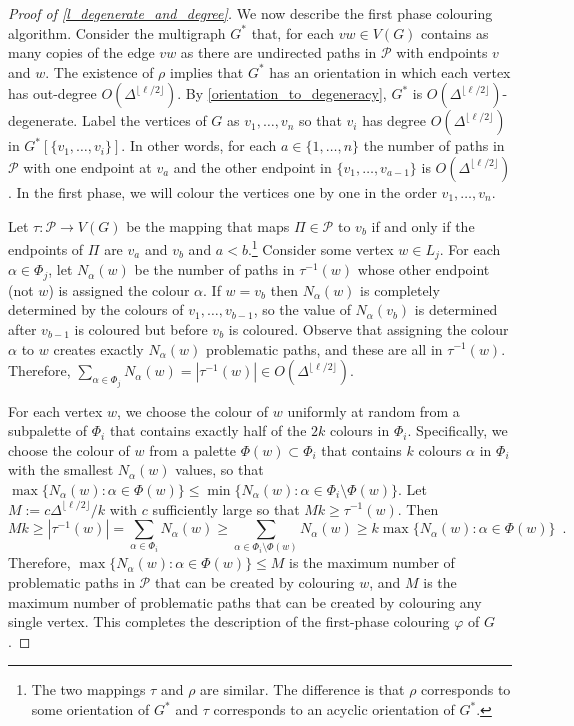 \documentclass{patmorin}
\begin{document}
\begin{proof}[Proof of \cref{l_degenerate_and_degree}]
  We now describe the first phase colouring algorithm.  Consider the multigraph $G^*$ that, for each $vw\in V(G)$ contains as many copies of the edge $vw$ as there are undirected paths in $\mathcal{P}$ with endpoints $v$ and $w$.  The existence of $\rho$ implies that $G^*$ has an orientation in which each vertex has out-degree $O(\Delta^{\lfloor\ell /2\rfloor})$.  By \cref{orientation_to_degeneracy}, $G^*$ is $O(\Delta^{\lfloor\ell /2\rfloor})$-degenerate.  Label the vertices of $G$ as $v_1,\ldots,v_n$ so that $v_i$ has degree $O(\Delta^{\lfloor\ell /2\rfloor})$ in $G^*[\{v_1,\ldots,v_{i}\}]$. In other words, for each $a\in\{1,\ldots,n\}$ the number of paths in $\mathcal{P}$ with one endpoint at $v_a$ and the other endpoint in $\{v_1,\ldots,v_{a-1}\}$ is $O(\Delta^{\lfloor\ell /2\rfloor})$.  In the first phase, we will colour the vertices one by one in the order $v_1,\ldots,v_n$.

  Let $\tau:\mathcal{P}\to V(G)$ be the mapping that maps $\Pi\in\mathcal{P}$ to $v_b$ if and only if the endpoints of $\Pi$ are $v_a$ and $v_b$ and $a < b$.\footnote{The two mappings $\tau$ and $\rho$ are similar. The difference is that $\rho$ corresponds to some orientation of $G^*$ and $\tau$ corresponds to an acyclic orientation of $G^*$.}  Consider some vertex $w\in L_j$.  For each $\alpha \in \Phi_j$, let $N_{\alpha}(w)$ be the number of paths in $\tau^{-1}(w)$ whose other endpoint (not $w$) is assigned the colour $\alpha$. If $w=v_b$ then $N_{\alpha}(w)$ is completely determined by the colours of $v_1,\ldots,v_{b-1}$, so the value of $N_\alpha(v_b)$ is determined after $v_{b-1}$ is coloured but before $v_b$ is coloured.  Observe that assigning the colour $\alpha$ to $w$ creates exactly $N_{\alpha}(w)$ problematic paths, and these are all in $\tau^{-1}(w)$.  Therefore, $\sum_{\alpha\in\Phi_j} N_\alpha(w)=|\tau^{-1}(w)|\in O(\Delta^{\lfloor\ell /2\rfloor})$.

  For each vertex $w$, we choose the colour of $w$ uniformly at random from a subpalette of $\Phi_i$ that contains exactly half of the $2k$ colours in $\Phi_i$.  Specifically, we choose the colour of $w$ from a palette $\Phi(w)\subset \Phi_i$ that contains $k$ colours $\alpha$ in $\Phi_i$ with the smallest $N_\alpha(w)$ values, so that  $\max\{N_\alpha(w):\alpha\in \Phi(w)\}\le\min\{N_\alpha(w):\alpha\in\Phi_i\setminus\Phi(w)\}$.  Let $M:=c\Delta^{\lfloor\ell/2\rfloor}/k$ with $c$ sufficiently large so that $Mk\ge \tau^{-1}(w)$.
  Then
  \[
    Mk \ge |\tau^{-1}(w)|= \sum_{\alpha\in \Phi_i} N_\alpha(w) \ge \sum_{\alpha\in\Phi_i\setminus\Phi(w)}N_\alpha(w) \ge k\max\{N_\alpha(w):\alpha\in \Phi(w)\} \enspace .
  \]
  Therefore, $\max\{N_\alpha(w):\alpha\in \Phi(w)\}\le M$ is the maximum number of problematic paths in $\mathcal{P}$ that can be created by colouring $w$, and $M$ is the maximum number of problematic paths that can be created by colouring any single vertex.  This completes the description of the first-phase colouring $\varphi$ of $G$.



\end{proof}
\end{document}
